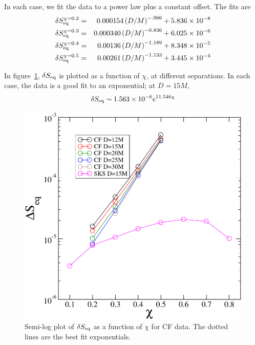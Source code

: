 In each case, we fit the data to
a power law plus a constant offset. The fits are
\begin{eqnarray*}
\delta S_{\rm eq}^{\chi = 0.2} &=&
0.000154\left(D/M\right)^{-.966}+5.836\times 10^{-8} \\
\delta S_{\rm eq}^{\chi = 0.3} &=&
0.000340\left(D/M\right)^{-0.836}+6.025\times 10^{-6} \\
\delta S_{\rm eq}^{\chi = 0.4} &=&
0.00136\left(D/M\right)^{-1.189}+8.348\times 10^{-5} \\
\delta S_{\rm eq}^{\chi = 0.5} &=&
0.00261\left(D/M\right)^{-1.133}+3.445\times 10^{-4}
\end{eqnarray*}

In figure~\ref{fig:SvsS}, $\delta S_{\rm eq}$ is plotted as a function
of $\chi$, at different separations. In each case, the data is a good
fit to an exponential; at $D=15M$,
\begin{equation}
\delta S_{\rm eq} \sim 1.563\times10^{-6}e^{11.546\chi}
\end{equation}

\begin{figure}[!htbp]
\includegraphics[scale=0.95]{chap5/SvsS2}
\caption{Semi-log plot of $\delta S_{\rm eq}$ as a function of $\chi$ for CF data. The
  dotted lines are the best fit exponentials.}
\label{fig:SvsS}
\end{figure}


